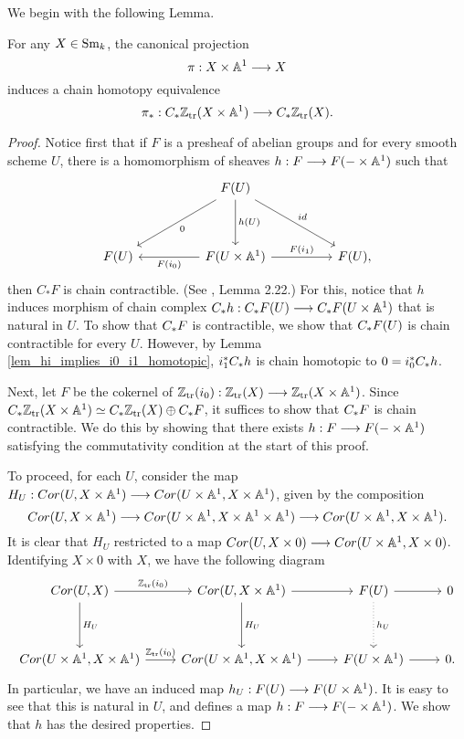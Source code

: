 We begin with the following Lemma.

\begin{lem}
For any $X \in \mathrm{Sm}_{k}$, the canonical projection
\[
\pi: X \times \mathbb{A}^1 \longrightarrow X
\]
induces a chain homotopy equivalence
\[
\pi_*: C_{*} \mathbb{Z}_{\mathrm{tr}}(X \times \mathbb{A}^1) \longrightarrow C_{*} \mathbb{Z}_{\mathrm{tr}}(X).
\]
\end{lem}

\begin{proof}
Notice first that if $F$ is a presheaf of abelian groups and for
every smooth scheme $U$, there is a homomorphism of sheaves $h:
F \longrightarrow F(- \times \mathbb{A}^1)$ such that
\begin{equation}\label{eq_contr_cond}
\begin{tikzcd}[row sep=huge, column sep=huge]
{}&
F(U) \arrow{ld}{0} \arrow{d}{h(U)} \arrow{rd}{id} \\
F(U) &
F(U \times \A^1) \arrow{l}{F(i_0)} \arrow{r}{F(i_1)} &
F(U),
\end{tikzcd}
\end{equation}
then $C_*F$ is chain contractible. (See \cite{MVW}, Lemma 2.22.) 
For this, notice that $h$ induces morphism of chain complex 
$C_{*} h : C_{*} F(U) \longrightarrow C_{*} F(U \times \mathbb{A}^1)$ that is 
natural in $U$. To show that $C_{*} F$ is contractible, we show 
that $C_{*} F(U)$ is chain contractible for every $U$. However, 
by Lemma \ref{lem_hi_implies_i0_i1_homotopic}, $i_1^* C_{*} h$ 
is chain homotopic to $0 = i_0^* C_{*} h$.

Next, let $F$ be the cokernel of $\mathbb{Z}_{\mathrm{tr}}(i_0): \mathbb{Z}_{\mathrm{tr}}(X) \longrightarrow \mathbb{Z}_{\mathrm{tr}}(X 
\times \mathbb{A}^1)$. Since $C_{*} \mathbb{Z}_{\mathrm{tr}}(X \times \mathbb{A}^1) \simeq C_{*}
\mathbb{Z}_{\mathrm{tr}}(X) \oplus C_{*} F$, it suffices to show that $C_{*} F$
is chain contractible. We do this by showing that there exists
$h: F \longrightarrow F(- \times \mathbb{A}^1)$ satisfying the commutativity condition 
at the start of this proof.

To proceed, for each $U$, consider the map $H_U: Cor(U, X \times 
\mathbb{A}^1) \longrightarrow Cor(U \times \mathbb{A}^1, X \times \mathbb{A}^1)$, given by the 
composition
\[
Cor(U, X \times \mathbb{A}^1) \longrightarrow
Cor(U \times \mathbb{A}^1, X \times \mathbb{A}^1 \times \mathbb{A}^1) \longrightarrow
Cor(U \times \mathbb{A}^1, X \times \mathbb{A}^1).
\]
It is clear that $H_U$ restricted to a map $Cor(U, X \times 0)
\longrightarrow Cor(U \times \mathbb{A}^1, X \times 0)$. Identifying $X \times 0$
with $X$, we have the following diagram
\[
\begin{tikzcd}[row sep=huge]
\Cor(U, X) \arrow{r}{\Ztr(i_0)} \arrow{d}{H_U} &
\Cor(U, X \times \A^1) \arrow{r} \arrow{d}{H_U} &
F(U) \arrow{r} \arrow[dotted]{d}{h_U}&
0 \\
\Cor(U \times \A^1, X \times \A^1) \arrow{r}{\Ztr(i_0)} &
\Cor(U \times \A^1, X \times \A^1) \arrow{r} &
F(U \times \A^1) \arrow{r} &
0.
\end{tikzcd}
\]
In particular, we have an induced map $h_U: F(U) \longrightarrow F(U \times 
\mathbb{A}^1)$. It is easy to see that this is natural in $U$, and defines 
a map $h : F \longrightarrow F( - \times \mathbb{A}^1)$. We show that $h$ has the
desired properties.


\end{proof}
